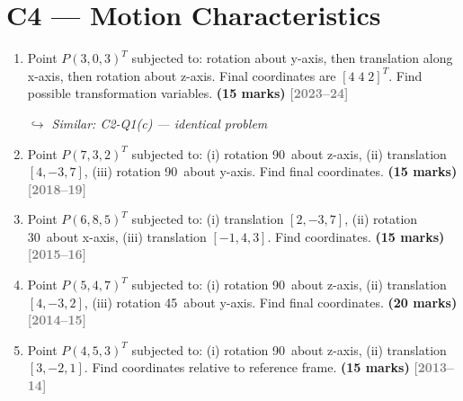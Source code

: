 \documentclass[12pt,a3paper]{article}
\newcommand{\yr}[1]{\hfill\textcolor{gray}{\small\textbf{[#1]}}}
\newcommand{\mk}[1]{\textcolor{orange!70!black}{\small\textbf{(#1 marks)}}}
\newcommand{\variant}[1]{\par\vspace{1pt}\textcolor{blue!50!black}%
  {\footnotesize\textit{$\hookrightarrow$ Similar: #1}}}
\begin{document}
\section{C4 --- Motion Characteristics}

\begin{enumerate}
\item \label{qlabel:C4-Q7}
Point $P(3,0,3)^T$ subjected to: rotation about y-axis, then
translation along x-axis, then rotation about z-axis. Final coordinates
are $[4\;4\;2]^T$. Find possible transformation variables. \mk{15}
\yr{2023--24}
\variant{C2-Q1(c) — identical problem}




\item \label{qlabel:C4-Q5}
Point $P(7,3,2)^T$ subjected to: (i) rotation 90\textdegree\ about
z-axis, (ii) translation $[4,-3,7]$, (iii) rotation 90\textdegree\
about y-axis. Find final coordinates. \mk{15}
\yr{2018--19}




\item \label{qlabel:C4-Q4}
Point $P(6,8,5)^T$ subjected to: (i) translation $[2,-3,7]$,
(ii) rotation 30\textdegree\ about x-axis, (iii) translation
$[-1,4,3]$. Find coordinates. \mk{15}
\yr{2015--16}




\item \label{qlabel:C4-Q3}
Point $P(5,4,7)^T$ subjected to: (i) rotation 90\textdegree\ about
z-axis, (ii) translation $[4,-3,2]$, (iii) rotation 45\textdegree\
about y-axis. Find final coordinates. \mk{20}
\yr{2014--15}




\item \label{qlabel:C4-Q2}
Point $P(4,5,3)^T$ subjected to: (i) rotation 90\textdegree\ about
z-axis, (ii) translation $[3,-2,1]$. Find coordinates relative to
reference frame. \mk{15}
\yr{2013--14}





\end{enumerate}
\end{document}
